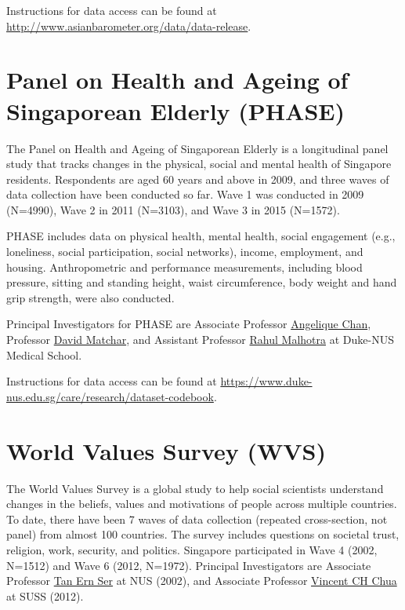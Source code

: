 \documentclass[openany]{book}
\begin{document}
Instructions for data access can be found at
\url{http://www.asianbarometer.org/data/data-release}.

\section{Panel on Health and Ageing of Singaporean Elderly
(PHASE)}\label{phase}

The Panel on Health and Ageing of Singaporean Elderly is a longitudinal
panel study that tracks changes in the physical, social and mental
health of Singapore residents. Respondents are aged 60 years and above
in 2009, and three waves of data collection have been conducted so far.
Wave 1 was conducted in 2009 (N=4990), Wave 2 in 2011 (N=3103), and Wave
3 in 2015 (N=1572).

PHASE includes data on physical health, mental health, social engagement
(e.g., loneliness, social participation, social networks), income,
employment, and housing. Anthropometric and performance measurements,
including blood pressure, sitting and standing height, waist
circumference, body weight and hand grip strength, were also conducted.

Principal Investigators for PHASE are Associate Professor
\href{https://www.duke-nus.edu.sg/hssr/our-team/faculty/faculty-staff-details/Detail/13200}{Angelique
Chan}, Professor
\href{https://www.duke-nus.edu.sg/hssr/our-team/faculty/faculty-staff-details/Detail/31920}{David
Matchar}, and Assistant Professor
\href{https://www.duke-nus.edu.sg/hssr/our-team/faculty/faculty-staff-details/Detail/30743}{Rahul
Malhotra} at Duke-NUS Medical School.

Instructions for data access can be found at
\url{https://www.duke-nus.edu.sg/care/research/dataset-codebook}.

\section{World Values Survey (WVS)}\label{wvs}

The World Values Survey is a global study to help social scientists
understand changes in the beliefs, values and motivations of people
across multiple countries. To date, there have been 7 waves of data
collection (repeated cross-section, not panel) from almost 100
countries. The survey includes questions on societal trust, religion,
work, security, and politics. Singapore participated in Wave 4 (2002,
N=1512) and Wave 6 (2012, N=1972). Principal Investigators are Associate
Professor \href{http://profile.nus.edu.sg/fass/soctanes/}{Tan Ern Ser}
at NUS (2002), and Associate Professor
\href{https://www.suss.edu.sg/about-suss/faculty-and-staff/detail/vincent-chua}{Vincent
CH Chua} at SUSS (2012).
\end{document}

